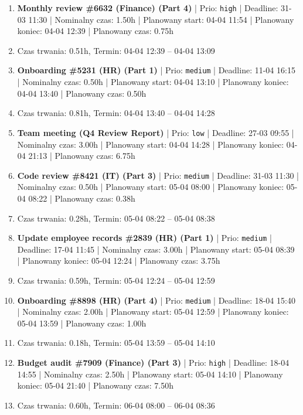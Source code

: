 {\begin{enumerate}
  \item [\textbf{14615}] \textbf{Monthly review \#6632 (Finance) (Part 4)} | Prio: \texttt{high} | Deadline: 31-03 11:30 | Nominalny czas: 1.50h | Planowany start: 04-04 11:54 | Planowany koniec: 04-04 12:39 | Planowany czas: 0.75h
  \item [\textbf{PRZERWA}] Czas trwania: 0.51h, Termin: 04-04 12:39 -- 04-04 13:09
  \item [\textbf{14671}] \textbf{Onboarding \#5231 (HR) (Part 1)} | Prio: \texttt{medium} | Deadline: 11-04 16:15 | Nominalny czas: 0.50h | Planowany start: 04-04 13:10 | Planowany koniec: 04-04 13:40 | Planowany czas: 0.50h
  \item [\textbf{PRZERWA}] Czas trwania: 0.81h, Termin: 04-04 13:40 -- 04-04 14:28
  \item [\textbf{14682}] \textbf{Team meeting (Q4 Review Report)} | Prio: \texttt{low} | Deadline: 27-03 09:55 | Nominalny czas: 3.00h | Planowany start: 04-04 14:28 | Planowany koniec: 04-04 21:13 | Planowany czas: 6.75h
  \item [\textbf{14665}] \textbf{Code review \#8421 (IT) (Part 3)} | Prio: \texttt{medium} | Deadline: 31-03 11:30 | Nominalny czas: 0.50h | Planowany start: 05-04 08:00 | Planowany koniec: 05-04 08:22 | Planowany czas: 0.38h
  \item [\textbf{PRZERWA}] Czas trwania: 0.28h, Termin: 05-04 08:22 -- 05-04 08:38
  \item [\textbf{14670}] \textbf{Update employee records \#2839 (HR) (Part 1)} | Prio: \texttt{medium} | Deadline: 17-04 11:45 | Nominalny czas: 3.00h | Planowany start: 05-04 08:39 | Planowany koniec: 05-04 12:24 | Planowany czas: 3.75h
  \item [\textbf{PRZERWA}] Czas trwania: 0.59h, Termin: 05-04 12:24 -- 05-04 12:59
  \item [\textbf{14636}] \textbf{Onboarding \#8898 (HR) (Part 4)} | Prio: \texttt{medium} | Deadline: 18-04 15:40 | Nominalny czas: 2.00h | Planowany start: 05-04 12:59 | Planowany koniec: 05-04 13:59 | Planowany czas: 1.00h
  \item [\textbf{PRZERWA}] Czas trwania: 0.18h, Termin: 05-04 13:59 -- 05-04 14:10
  \item [\textbf{14616}] \textbf{Budget audit \#7909 (Finance) (Part 3)} | Prio: \texttt{high} | Deadline: 18-04 14:55 | Nominalny czas: 2.50h | Planowany start: 05-04 14:10 | Planowany koniec: 05-04 21:40 | Planowany czas: 7.50h
  \item [\textbf{PRZERWA}] Czas trwania: 0.60h, Termin: 06-04 08:00 -- 06-04 08:36

\end{enumerate}}
